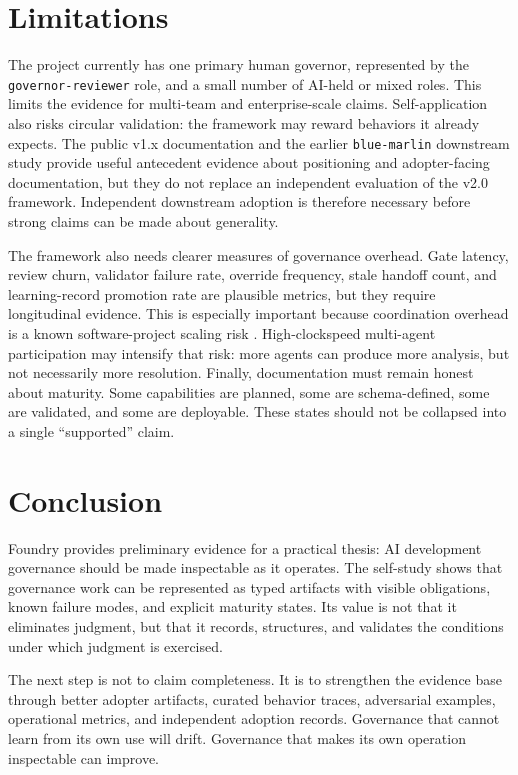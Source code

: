 \documentclass[conference]{IEEEtran}
\begin{document}
\section{Limitations}

The project currently has one primary human governor, represented by the \texttt{governor-reviewer} role, and a small number of AI-held or mixed roles. This limits the evidence for multi-team and enterprise-scale claims. Self-application also risks circular validation: the framework may reward behaviors it already expects. The public v1.x documentation and the earlier \texttt{blue-marlin} downstream study provide useful antecedent evidence about positioning and adopter-facing documentation, but they do not replace an independent evaluation of the v2.0 framework. Independent downstream adoption is therefore necessary before strong claims can be made about generality.

The framework also needs clearer measures of governance overhead. Gate latency, review churn, validator failure rate, override frequency, stale handoff count, and learning-record promotion rate are plausible metrics, but they require longitudinal evidence. This is especially important because coordination overhead is a known software-project scaling risk \cite{brooks1975mythical}. High-clockspeed multi-agent participation may intensify that risk: more agents can produce more analysis, but not necessarily more resolution. Finally, documentation must remain honest about maturity. Some capabilities are planned, some are schema-defined, some are validated, and some are deployable. These states should not be collapsed into a single ``supported'' claim.

\section{Conclusion}

Foundry provides preliminary evidence for a practical thesis: AI development governance should be made inspectable as it operates. The self-study shows that governance work can be represented as typed artifacts with visible obligations, known failure modes, and explicit maturity states. Its value is not that it eliminates judgment, but that it records, structures, and validates the conditions under which judgment is exercised.

The next step is not to claim completeness. It is to strengthen the evidence base through better adopter artifacts, curated behavior traces, adversarial examples, operational metrics, and independent adoption records. Governance that cannot learn from its own use will drift. Governance that makes its own operation inspectable can improve.



\end{document}

